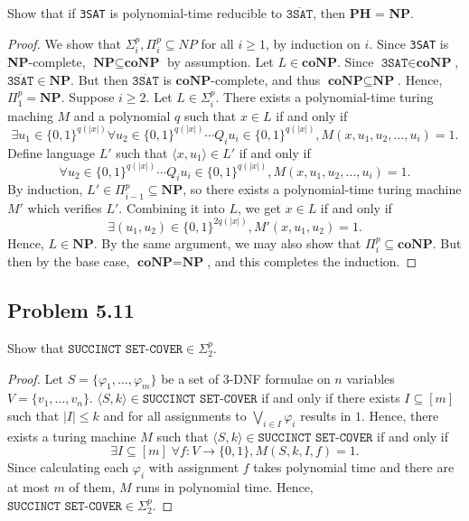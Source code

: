\documentclass[a4paper]{article}
\begin{document}
Show that if \texttt{3SAT} is polynomial-time reducible to $\overline{\texttt{3SAT}}$, then
\textbf{PH} = \textbf{NP}.

\begin{proof}
  We show that $\Sigma_i^p, \Pi_i^p \subseteq NP$ for all $i \geq 1$, by induction on $i$. Since
  \texttt{3SAT} is \textbf{NP}-complete, $\textbf{NP} \subseteq \textbf{coNP}$ by assumption. Let $L
  \in \textbf{coNP}$. Since $\texttt{3SAT} \in \textbf{coNP}$, $\overline{\texttt{3SAT}} \in
  \textbf{NP}$. But then $\overline{\texttt{3SAT}}$ is $\textbf{coNP}$-complete, and thus
  $\textbf{coNP} \subseteq \textbf{NP}$. Hence, $\Pi_1^p = \textbf{NP}$. Suppose $i \geq 2$. Let $L
  \in \Sigma_i^p$. There exists a polynomial-time turing maching $M$ and a polynomial $q$ such that
  $x \in L$ if and only if
  \[
    \exists u_1 \in \{0, 1\}^{q(|x|)} \forall u_2 \in \{0, 1\}^{q(|x|)} \cdots Q_iu_i \in \{0, 1\}^{q(|x|)}, M(x, u_1, u_2, \ldots, u_i) = 1.
  \]
  Define language $L'$ such that $\langle x, u_1 \rangle \in L'$ if and only if
  \[
    \forall u_2 \in \{0, 1\}^{q(|x|)} \cdots Q_iu_i \in \{0, 1\}^{q(|x|)}, M(x, u_1, u_2, \ldots, u_i) = 1.
  \]
  By induction, $L' \in \Pi_{i - 1}^p \subseteq \textbf{NP}$, so there exists a polynomial-time
  turing machine $M'$ which verifies $L'$. Combining it into $L$, we get $x \in L$ if and only if
  \[
    \exists (u_1, u_2) \in \{0, 1\}^{2q(|x|)}, M'(x, u_1, u_2) = 1.
  \]
  Hence, $L \in \textbf{NP}$. By the same argument, we may also show that $\Pi_i^p \subseteq
  \textbf{coNP}$. But then by the base case, $\textbf{coNP} = \textbf{NP}$, and this completes the
  induction. 
\end{proof}

\subsection*{Problem 5.11}

Show that $\texttt{SUCCINCT SET-COVER} \in \Sigma_2^p$. 

\begin{proof}
  Let $S = \{\varphi_1, \ldots, \varphi_m\}$ be a set of 3-DNF formulae on $n$ variables $V = \{v_1,
  \ldots, v_n\}$. $\langle S, k \rangle \in \texttt{SUCCINCT SET-COVER}$ if and only if there exists
  $I \subseteq [m]$ such that $|I| \leq k$ and for all assignments to $\bigvee_{i \in I} \varphi_i$
  results in $1$. Hence, there exists a turing machine $M$ such that $\langle S, k \rangle \in
  \texttt{SUCCINCT SET-COVER}$ if and only if
  \[
    \exists I \subseteq [m] \; \forall f: V \to \{0, 1\}, M(S, k, I, f) = 1.
  \]
  Since calculating each $\varphi_i$ with assignment $f$ takes polynomial time and there are at most
  $m$ of them, $M$ runs in polynomial time. Hence, $\texttt{SUCCINCT SET-COVER} \in \Sigma_2^p$. 
\end{proof}
\end{document}
